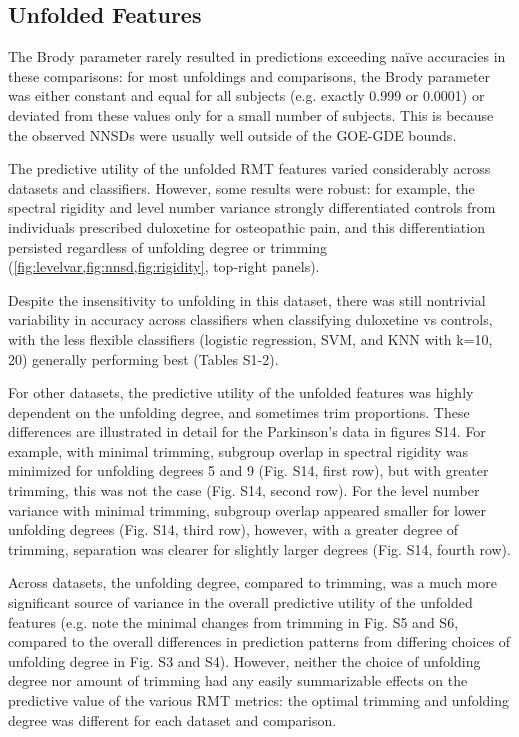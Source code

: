 \documentclass[NETN,manuscript]{stjour-new}
\begin{document}
\subsection{Unfolded Features}
The Brody parameter rarely resulted in predictions exceeding naïve accuracies in these comparisons:
for most unfoldings and comparisons, the Brody parameter was either constant and equal for all
subjects (e.g. exactly 0.999 or 0.0001) or deviated from these values only for a small number of
subjects. This is because the observed NNSDs were usually well outside of the GOE-GDE bounds.

The predictive utility of the unfolded RMT features varied considerably across datasets and
classifiers. However, some results were robust: for example, the spectral rigidity and level number
variance strongly differentiated controls from individuals prescribed duloxetine for osteopathic
pain, and this differentiation persisted regardless of unfolding degree or trimming
(\cref{fig:levelvar,fig:nnsd,fig:rigidity}, top-right panels).

Despite the insensitivity to unfolding in this dataset, there was still nontrivial variability in
accuracy across classifiers when classifying duloxetine vs controls, with the less flexible
classifiers (logistic regression, SVM, and KNN with k=10, 20) generally performing best (Tables
S1-2).

For other datasets, the predictive utility of the unfolded features was highly dependent on the
unfolding degree, and sometimes trim proportions. These differences are illustrated in detail for
the Parkinson's data in figures S14. For example, with minimal trimming, subgroup overlap in spectral
rigidity was minimized for unfolding degrees 5 and 9 (Fig. S14, first row), but with greater
trimming, this was not the case (Fig. S14, second row). For the level number variance with minimal
trimming, subgroup overlap appeared smaller for lower unfolding degrees (Fig. S14, third row),
however, with a greater degree of trimming, separation was clearer for slightly larger degrees (Fig.
S14, fourth row).

Across datasets, the unfolding degree, compared to trimming, was a much more significant source of
variance in the overall predictive utility of the unfolded features (e.g. note the minimal changes
from trimming in Fig. S5 and S6, compared to the overall differences in prediction patterns from
differing choices of unfolding degree in Fig. S3 and S4). However, neither the choice of unfolding
degree nor amount of trimming had any easily summarizable effects on the predictive value of the
various RMT metrics: the optimal trimming and unfolding degree was different for each dataset and
comparison.
\end{document}
